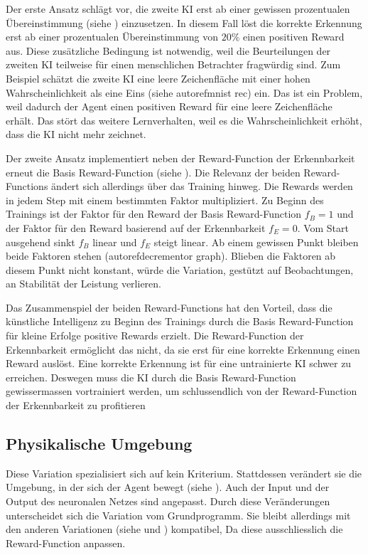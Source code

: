 Der erste Ansatz schlägt vor, die zweite KI erst ab einer gewissen prozentualen
Übereinstimmung (siehe ) einzusetzen. In diesem Fall
löst die korrekte Erkennung erst ab einer prozentualen Übereinstimmung von
$20\%$ einen positiven Reward aus. Diese zusätzliche Bedingung ist notwendig,
weil die Beurteilungen der zweiten KI teilweise für einen menschlichen
Betrachter fragwürdig sind. Zum Beispiel schätzt die zweite KI eine leere
Zeichenfläche mit einer hohen Wahrscheinlichkeit als eine Eins (siehe
autoref{mnist rec}) ein. Das ist ein Problem, weil dadurch der Agent einen
positiven Reward für eine leere Zeichenfläche erhält. Das stört das weitere
Lernverhalten, weil es die Wahrscheinlichkeit erhöht, dass die KI nicht mehr
zeichnet.


Der zweite Ansatz implementiert neben der Reward-Function der Erkennbarkeit
erneut die Basis Reward-Function (siehe ). Die Relevanz
der beiden Reward-Functions ändert sich allerdings über das Training hinweg. Die
Rewards werden in jedem Step mit einem bestimmten Faktor multipliziert. Zu
Beginn des Trainings ist der Faktor für den Reward der Basis Reward-Function
$f_B = 1$ und der Faktor für den Reward basierend auf der Erkennbarkeit $f_E =
0$. Vom Start ausgehend sinkt $f_B$ linear und $f_E$ steigt linear. Ab einem
gewissen Punkt bleiben beide Faktoren stehen (autoref{decrementor graph}).
Blieben die Faktoren ab diesem Punkt nicht konstant, würde die Variation,
gestützt auf Beobachtungen, an Stabilität der Leistung verlieren.


Das Zusammenspiel der beiden Reward-Functions hat den Vorteil, dass die
künstliche Intelligenz zu Beginn des Trainings durch die Basis Reward-Function
für kleine Erfolge positive Rewards erzielt. Die Reward-Function der
Erkennbarkeit ermöglicht das nicht, da sie erst für eine korrekte Erkennung
einen Reward auslöst. Eine korrekte Erkennung ist für eine untrainierte KI
schwer zu erreichen. Deswegen muss die KI durch die Basis Reward-Function
gewissermassen vortrainiert werden, um schlussendlich von der Reward-Function
der Erkennbarkeit zu profitieren


\subsection{Physikalische Umgebung}
\label{sub:m_var_phy}
Diese Variation spezialisiert sich auf kein Kriterium. Stattdessen verändert sie
die Umgebung, in der sich der Agent bewegt (siehe ). Auch
der Input und der Output des neuronalen Netzes sind angepasst. Durch diese
Veränderungen unterscheidet sich die Variation vom Grundprogramm. Sie bleibt
allerdings mit den anderen Variationen (siehe  und
) kompatibel, Da diese ausschliesslich die
Reward-Function anpassen.

